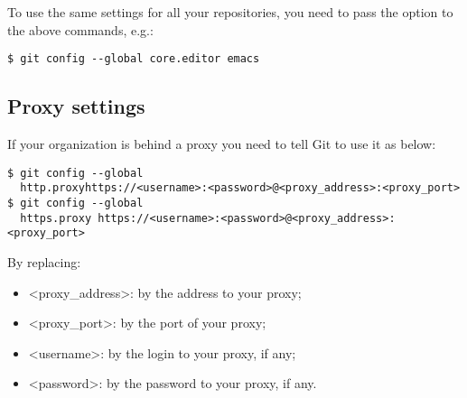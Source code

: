 To use the same settings for all your  repositories, you need to pass
the  option to the above commands, e.g.:
\begin{small}
\begin{lstlisting}
$ git config --global core.editor emacs
\end{lstlisting}
\end{small}

\subsection{Proxy settings}

If your organization is behind a proxy you need to tell Git to use it as below:
\begin{small}
\begin{lstlisting}
$ git config --global
  http.proxyhttps://<username>:<password>@<proxy_address>:<proxy_port>
$ git config --global
  https.proxy https://<username>:<password>@<proxy_address>:<proxy_port>
\end{lstlisting}
\end{small}

By replacing:
\begin{itemize}
  \item <proxy\_address>: by the address to your proxy;
  \item <proxy\_port>: by the port of your proxy;
  \item <username>: by the login to your proxy, if any;
  \item <password>: by the password to your proxy, if any.
\end{itemize}